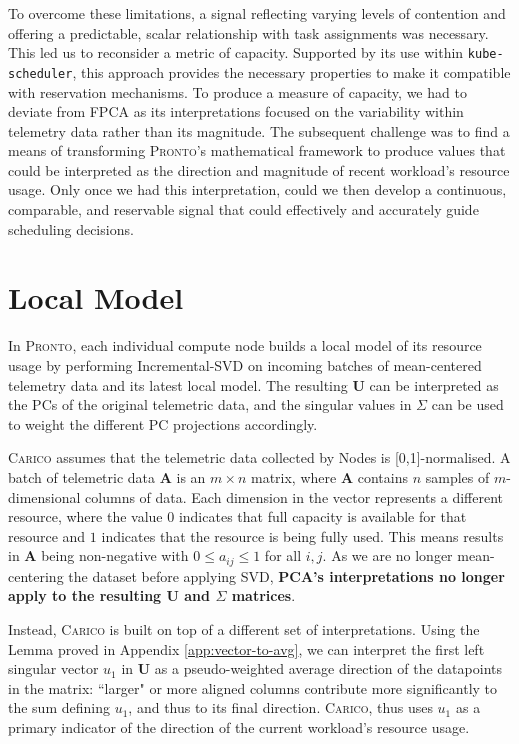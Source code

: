 To overcome these limitations, a signal reflecting varying levels of contention
and offering a predictable, scalar relationship with task assignments was
necessary. This led us to reconsider a metric of capacity. Supported by its use
within \texttt{kube-scheduler}, this approach provides the necessary properties
to make it compatible with reservation mechanisms. To produce a measure of
capacity, we had to deviate from FPCA as its interpretations focused on the
variability within telemetry data rather than its magnitude. The subsequent
challenge was to find a means of transforming \textsc{Pronto}'s mathematical
framework to produce values that could be interpreted as the direction and
magnitude of recent workload's resource usage. Only once we had this
interpretation, could we then develop a continuous, comparable, and reservable
signal that could effectively and accurately guide scheduling decisions.

\section{Local Model}
\label{sec:local-model-construction}
In \textsc{Pronto}, each individual compute node builds a local model of its
resource usage by performing Incremental-SVD on incoming batches of
mean-centered telemetry data and its latest local model. The resulting
$\mathbf{U}$ can be interpreted as the PCs of the original telemetric data, and
the singular values in $\Sigma$ can be used to weight the different PC
projections accordingly.

\textsc{Carico} assumes that the telemetric data collected by Nodes is
[0,1]-normalised. A batch of telemetric data $\mathbf{A}$ is an $m \times n$
matrix, where $\mathbf{A}$ contains $n$ samples of $m$-dimensional columns of
data. Each dimension in the vector represents a different resource, where the
value $0$ indicates that full capacity is available for that resource and $1$
indicates that the resource is being fully used. This means results in
$\mathbf{A}$ being non-negative with $0 \leq a_{ij} \leq 1$ for all $i,j$. As we
are no longer mean-centering the dataset before applying SVD, \textbf{PCA's
interpretations no longer apply to the resulting $\mathbf{U}$ and $\Sigma$
matrices}.

Instead, \textsc{Carico} is built on top of  a different set of interpretations.
Using the Lemma proved in Appendix \ref{app:vector-to-avg}, we can interpret the
first left singular vector $u_1$ in $\mathbf{U}$ as a pseudo-weighted average
direction of the datapoints in the matrix: ``larger" or more aligned columns
contribute more significantly to the sum defining $u_1$, and thus to its final
direction. \textsc{Carico}, thus uses $u_1$ as a primary indicator of the
direction of the current workload's resource usage.

